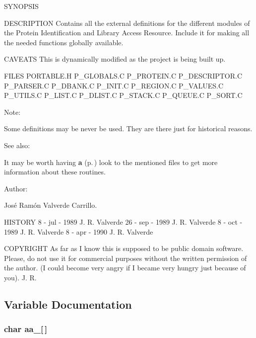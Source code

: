  

 SYNOPSIS

DESCRIPTION  Contains all the external definitions for the  different modules of the Protein Identification and  Library Access Resource. Include it for making all  the needed functions globally available.

CAVEATS  This is dynamically modified as the project is  being built up.

FILES  PORTABLE.H  P\_\-GLOBALS.C  P\_\-PROTEIN.C  P\_\-DESCRIPTOR.C  P\_\-PARSER.C  P\_\-DBANK.C  P\_\-INIT.C  P\_\-REGION.C  P\_\-VALUES.C  P\_\-UTILS.C  P\_\-LIST.C  P\_\-DLIST.C  P\_\-STACK.C  P\_\-QUEUE.C  P\_\-SORT.C

\begin{Desc}
\item[Note: ]\par
 Some definitions may be never be used. They are  there just for historical reasons.\end{Desc}
\begin{Desc}
\item[See also: ]\par
 It may be worth having {\bf a} {\rm (p.\,\pageref{P__sort_8c_a14})} look to the mentioned  files to get more information about these routines.\end{Desc}
\begin{Desc}
\item[Author: ]\par
 Jos\'{e} Ram\'{o}n Valverde Carrillo.\end{Desc}
HISTORY  8 - jul - 1989 J. R. Valverde  26 - sep - 1989 J. R. Valverde  8 - oct - 1989 J. R. Valverde  8 - apr - 1990 J. R. Valverde

COPYRIGHT  As far as I know this is supposed to be public  domain software. Please, do not use it for commercial  purposes without the written permission of the author.  (I could become very angry if I became very hungry just  because of you).  J. R.



\subsection{Variable Documentation}
\subsubsection{\setlength{\rightskip}{0pt plus 5cm}char aa\_[$\,$]}\label{P__extern_8h_a0}


